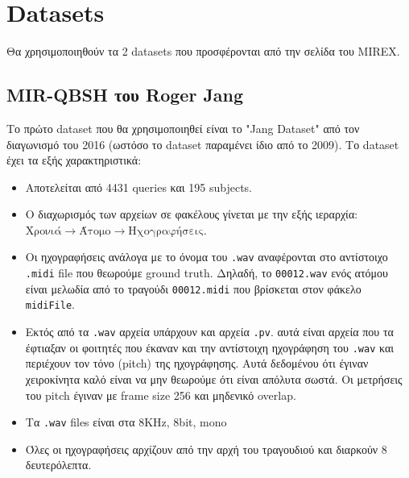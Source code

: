 \section{Datasets}

Θα χρησιμοποιηθούν τα 2 datasets που προσφέρονται από την σελίδα του MIREX\cite{mirex}.

\subsection{MIR-QBSH του Roger Jang}
Το πρώτο dataset που θα χρησιμοποιηθεί είναι το "Jang Dataset"\cite{jang-dataset} από τον διαγωνισμό του 2016 (ωστόσο το dataset παραμένει ίδιο από το 2009). Το dataset έχει τα εξής χαρακτηριστικά:
\begin{itemize}
\item Αποτελείται από 4431 queries και 195 subjects.
\item Ο διαχωρισμός των αρχείων σε φακέλους γίνεται με την εξής ιεραρχία:
\(\text{Χρονιά} \rightarrow \text{Άτομο} \rightarrow \text{Ηχογραφήσεις}\).
\item Οι ηχογραφήσεις ανάλογα με το όνομα του \texttt{.wav} αναφέρονται στο αντίστοιχο \texttt{.midi} file που θεωρούμε ground truth.
Δηλαδή, το \texttt{00012.wav} ενός ατόμου είναι μελωδία από το τραγούδι \texttt{00012.midi} που βρίσκεται στον φάκελο \texttt{midiFile}.
\item Εκτός από τα \texttt{.wav} αρχεία υπάρχουν και αρχεία \texttt{.pv}.
αυτά είναι αρχεία που τα έφτιαξαν οι φοιτητές που έκαναν και την αντίστοιχη
ηχογράφηση του \texttt{.wav} και περιέχουν τον τόνο (pitch) της ηχογράφησης. Αυτά δεδομένου ότι
έγιναν χειροκίνητα καλό είναι να μην θεωρούμε ότι είναι απόλυτα σωστά. Οι μετρήσεις του
pitch έγιναν με frame size 256 και μηδενικό overlap.
\item Τα \texttt{.wav} files είναι στα 8KHz, 8bit, mono
\item Όλες οι ηχογραφήσεις αρχίζουν από την αρχή του τραγουδιού και διαρκούν 8 δευτερόλεπτα.
\end{itemize}

